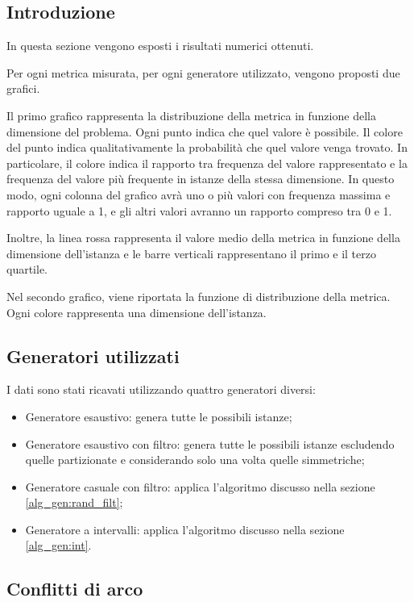 \documentclass[../../relazione.tex]{subfiles}
\begin{document}
\subsection{Introduzione}
In questa sezione vengono esposti i risultati numerici ottenuti.

Per ogni metrica misurata, per ogni generatore utilizzato, vengono proposti due grafici.

Il primo grafico rappresenta la distribuzione della metrica in funzione della dimensione del problema.
Ogni punto indica che quel valore è possibile.
Il colore del punto indica qualitativamente la probabilità che quel valore venga trovato.
In particolare, il colore indica il rapporto tra frequenza del valore rappresentato e la frequenza del valore più frequente in istanze della stessa dimensione.
In questo modo, ogni colonna del grafico avrà uno o più valori con frequenza massima e rapporto uguale a 1, e gli altri valori avranno un rapporto compreso tra 0 e 1.

Inoltre, la linea rossa rappresenta il valore medio della metrica in funzione della dimensione dell'istanza e le barre verticali rappresentano il primo e il terzo quartile.

Nel secondo grafico, viene riportata la funzione di distribuzione della metrica.
Ogni colore rappresenta una dimensione dell'istanza.

\subsection{Generatori utilizzati}
I dati sono stati ricavati utilizzando quattro generatori diversi:
\begin{itemize}
    \item Generatore esaustivo: genera tutte le possibili istanze;
    \item Generatore esaustivo con filtro: genera tutte le possibili istanze escludendo quelle partizionate e considerando solo una volta quelle simmetriche;
    \item Generatore casuale con filtro: applica l'algoritmo discusso nella sezione \ref{alg_gen:rand_filt};
    \item Generatore a intervalli: applica l'algoritmo discusso nella sezione \ref{alg_gen:int}.
\end{itemize}

\subsection{Conflitti di arco}
\end{document}
